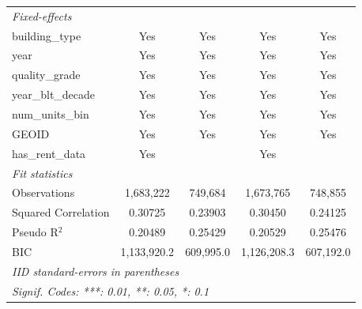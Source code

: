 \begin{tabular}{lcccc}
   \emph{Fixed-effects}\\
   building\_type                            & Yes            & Yes            & Yes            & Yes\\  
   year                                      & Yes            & Yes            & Yes            & Yes\\  
   quality\_grade                            & Yes            & Yes            & Yes            & Yes\\  
   year\_blt\_decade                         & Yes            & Yes            & Yes            & Yes\\  
   num\_units\_bin                           & Yes            & Yes            & Yes            & Yes\\  
   GEOID                                     & Yes            & Yes            & Yes            & Yes\\  
   has\_rent\_data                           & Yes            &                & Yes            & \\  
   \midrule
   \emph{Fit statistics}\\
   Observations                              & 1,683,222      & 749,684        & 1,673,765      & 748,855\\  
   Squared Correlation                       & 0.30725        & 0.23903        & 0.30450        & 0.24125\\  
   Pseudo R$^2$                              & 0.20489        & 0.25429        & 0.20529        & 0.25476\\  
   BIC                                       & 1,133,920.2    & 609,995.0      & 1,126,208.3    & 607,192.0\\  
   \midrule \midrule
   \multicolumn{5}{l}{\emph{IID standard-errors in parentheses}}\\
   \multicolumn{5}{l}{\emph{Signif. Codes: ***: 0.01, **: 0.05, *: 0.1}}\\
\end{tabular}
\par\endgroup
